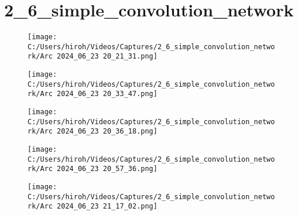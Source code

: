 \documentclass{ltjsarticle}
\begin{document}
\clearpage
\section{2\_6\_simple\_convolution\_network}
\begin{figure}[htbp]
  \centering
  \texttt{[image: C:/Users/hiroh/Videos/Captures/2\_6\_simple\_convolution\_network/Arc 2024\_06\_23 20\_21\_31.png]}
\end{figure}
\begin{figure}[htbp]
  \centering
  \texttt{[image: C:/Users/hiroh/Videos/Captures/2\_6\_simple\_convolution\_network/Arc 2024\_06\_23 20\_33\_47.png]}
\end{figure}
\begin{figure}[htbp]
  \centering
  \texttt{[image: C:/Users/hiroh/Videos/Captures/2\_6\_simple\_convolution\_network/Arc 2024\_06\_23 20\_36\_18.png]}
\end{figure}
\begin{figure}[htbp]
  \centering
  \texttt{[image: C:/Users/hiroh/Videos/Captures/2\_6\_simple\_convolution\_network/Arc 2024\_06\_23 20\_57\_36.png]}
\end{figure}
\begin{figure}[htbp]
  \centering
  \texttt{[image: C:/Users/hiroh/Videos/Captures/2\_6\_simple\_convolution\_network/Arc 2024\_06\_23 21\_17\_02.png]}
\end{figure}

\clearpage
\end{document}
